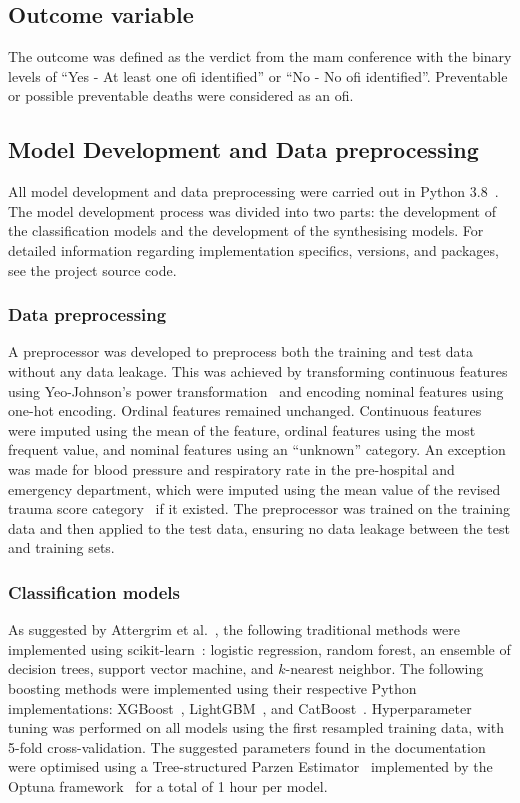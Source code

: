 \documentclass[12pt, a4paper]{article}
\begin{document}
\subsection{Outcome variable}
The outcome was defined as the verdict from the \acrshort{mam} conference with the binary levels of ``Yes - At least
one \acrshort{ofi} identified'' or ``No - No \acrshort{ofi} identified''. Preventable or possible preventable deaths
were considered as an \acrshort{ofi}.

\subsection{Model Development and Data preprocessing}
All model development and data preprocessing were carried out in Python 3.8~\cite{python_2009}. The model development
process was divided into two parts: the development of the classification models and the development of the
synthesising models. For detailed information regarding implementation specifics, versions, and packages, see the
project source code.

\subsubsection*{Data preprocessing}
A preprocessor was developed to preprocess both the training and test data without any data leakage. This was achieved
by transforming continuous features using Yeo-Johnson's power transformation~\cite{yeo_new_2000} and encoding nominal
features using one-hot encoding. Ordinal features remained unchanged. Continuous features were imputed using the mean
of the feature, ordinal features using the most frequent value, and nominal features using an ``unknown'' category. An
exception was made for blood pressure and respiratory rate in the pre-hospital and emergency department, which were
imputed using the mean value of the revised trauma score category~\cite{ringdal_utstein_2008} if it existed. The
preprocessor was trained on the training data and then applied to the test data, ensuring no data leakage between the
test and training sets.

\subsubsection*{Classification models}
As suggested by Attergrim et al.~\cite{attergrim_predicting_2023}, the following traditional methods were
implemented using scikit-learn~\cite{pedregosa_scikit_2011}: logistic regression, random forest, an ensemble
of decision trees, support vector machine, and $k$-nearest neighbor. The following boosting methods were
implemented using their respective Python implementations: XGBoost~\cite{chen_xgboost_2016},
LightGBM~\cite{ke_lightgbm_2017}, and CatBoost~\cite{prokhorenkova_catboost_2018}. Hyperparameter tuning
was performed on all models using the first resampled training data, with 5-fold cross-validation. The suggested
parameters found in the documentation were optimised using a Tree-structured Parzen
Estimator~\cite{bergstra_algorithms_2011} implemented by the Optuna framework~\cite{optuna_2019} for a total of
1 hour per model.
\end{document}
